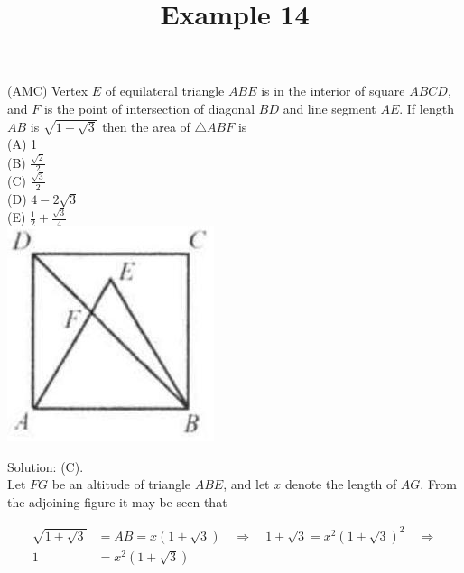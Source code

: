 \documentclass{article}
\title{Example 14}
\date{}
\begin{document}
\maketitle

(AMC) Vertex \(E\) of equilateral triangle \(A B E\) is in the interior of square \(A B C D\), and \(F\) is the point of intersection of diagonal \(B D\) and line segment \(A E\). If length \(A B\) is \(\sqrt{1+\sqrt{3}}\) then the area of \(\triangle A B F\) is\\
(A) 1\\
(B) \(\frac{\sqrt{2}}{2}\)\\
(C) \(\frac{\sqrt{3}}{2}\)\\
(D) \(4-2 \sqrt{3}\)\\
(E) \(\frac{1}{2}+\frac{\sqrt{3}}{4}\)\\
\centering
\includegraphics[width=\textwidth]{images/problem_image_1.jpg}

Solution: (C).\\
Let \(F G\) be an altitude of triangle \(A B E\), and let \(x\) denote the length of \(A G\). From the adjoining figure it may be seen that

\[
\begin{aligned}
\sqrt{1+\sqrt{3}} & =A B=x(1+\sqrt{3}) \quad \Rightarrow \quad 1+\sqrt{3}=x^{2}(1+\sqrt{3})^{2} \quad \Rightarrow \\
1 & =x^{2}(1+\sqrt{3})
\end{aligned}
\]
\end{document}

